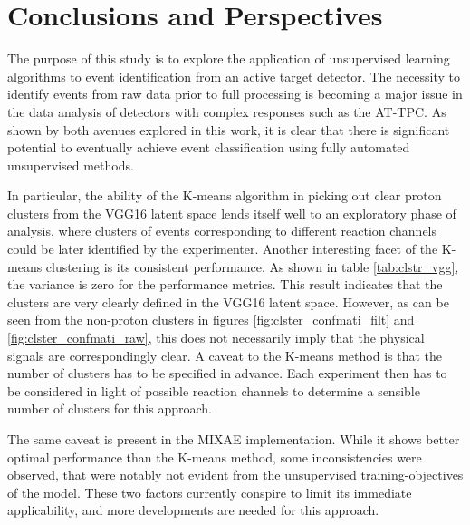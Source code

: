 \documentclass[review,number,sort&compress]{elsarticle}
\begin{document}
\section{Conclusions and Perspectives}\label{sec{conclusion}}
The purpose of this study is to explore the application of unsupervised learning algorithms to event identification from an active target detector. The necessity to identify events from raw data prior to full processing is becoming a major issue in the data analysis of detectors with complex responses such as the AT-TPC.
As shown by both avenues explored in this work, it is clear that there is significant potential to eventually achieve event classification using fully automated unsupervised methods.

In particular, the ability of the K-means algorithm in picking out clear proton clusters from the VGG16 latent space lends itself well to an exploratory phase of analysis, where clusters of events corresponding to different reaction channels could be later identified by the experimenter.
Another interesting facet of the K-means clustering is its consistent performance. As shown in table \ref{tab:clstr_vgg}, the variance is zero for the performance metrics. This result indicates that the clusters are very clearly defined in the VGG16 latent space. However, as can be seen from the non-proton clusters in figures \ref{fig:clster_confmati_filt} and \ref{fig:clster_confmati_raw},  this does not necessarily imply that the physical signals are correspondingly clear. 
A caveat to the K-means method is that the number of clusters has to be specified in advance. Each experiment then has to be considered in light of possible reaction channels to determine a sensible number of clusters for this approach. 

The same caveat is present in the MIXAE implementation. While it shows better optimal performance than the K-means method, some inconsistencies were observed, that were notably not evident from the unsupervised training-objectives of the model. These two factors currently conspire to limit its immediate applicability, and more developments are needed for this approach. 
\end{document}
